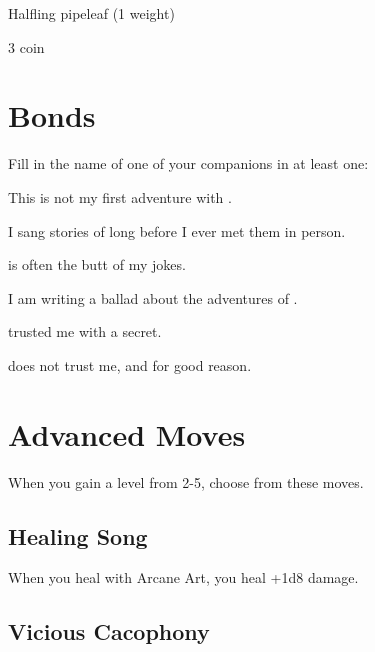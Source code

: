  
\item Halfling pipeleaf (1 weight)

 
\item 3 coin


\stopitemize


 
\section{Bonds}   
 



Fill in the name of one of your companions in at least one:

 

This is not my first adventure with \thinrules[2].

 

I sang stories of \thinrules[2] long before I ever met them in person.

 

\thinrules[2] is often the butt of my jokes.

 

I am writing a ballad about the adventures of \thinrules[2].

 

\thinrules[2] trusted me with a secret.

 

\thinrules[2] does not trust me, and for good reason.



 
\section{Advanced Moves}    
 


\startInstructionsAfterHeader
When you gain a level from 2-5, choose from these moves.
\stopInstructionsAfterHeader
 
\subsection{Healing Song}   
 

When you heal with Arcane Art, you heal +1d8 damage.

 
\subsection{Vicious Cacophony}    
 

